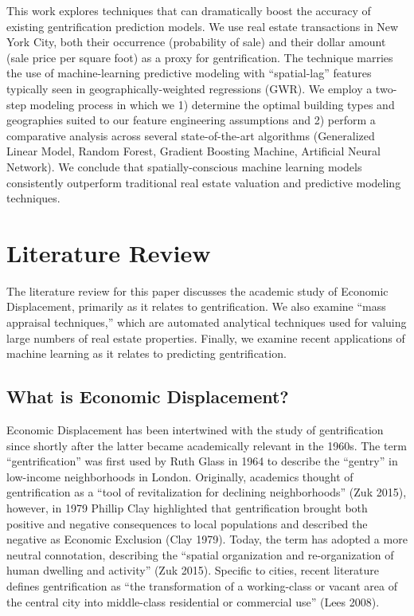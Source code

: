 \documentclass[12pt,]{article}
\begin{document}
This work explores techniques that can dramatically boost the accuracy
of existing gentrification prediction models. We use real estate
transactions in New York City, both their occurrence (probability of
sale) and their dollar amount (sale price per square foot) as a proxy
for gentrification. The technique marries the use of machine-learning
predictive modeling with ``spatial-lag'' features typically seen in
geographically-weighted regressions (GWR). We employ a two-step modeling
process in which we 1) determine the optimal building types and
geographies suited to our feature engineering assumptions and 2) perform
a comparative analysis across several state-of-the-art algorithms
(Generalized Linear Model, Random Forest, Gradient Boosting Machine,
Artificial Neural Network). We conclude that spatially-conscious machine
learning models consistently outperform traditional real estate
valuation and predictive modeling techniques.

\hypertarget{literature-review}{%
\section{Literature Review}\label{literature-review}}

The literature review for this paper discusses the academic study of
Economic Displacement, primarily as it relates to gentrification. We
also examine ``mass appraisal techniques,'' which are automated
analytical techniques used for valuing large numbers of real estate
properties. Finally, we examine recent applications of machine learning
as it relates to predicting gentrification.

\hypertarget{what-is-economic-displacement}{%
\subsection{What is Economic
Displacement?}\label{what-is-economic-displacement}}

Economic Displacement has been intertwined with the study of
gentrification since shortly after the latter became academically
relevant in the 1960s. The term ``gentrification'' was first used by
Ruth Glass in 1964 to describe the ``gentry'' in low-income
neighborhoods in London. Originally, academics thought of gentrification
as a ``tool of revitalization for declining neighborhoods'' (Zuk 2015),
however, in 1979 Phillip Clay highlighted that gentrification brought
both positive and negative consequences to local populations and
described the negative as Economic Exclusion (Clay 1979). Today, the
term has adopted a more neutral connotation, describing the ``spatial
organization and re-organization of human dwelling and activity'' (Zuk
2015). Specific to cities, recent literature defines gentrification as
``the transformation of a working-class or vacant area of the central
city into middle-class residential or commercial use'' (Lees 2008).
\end{document}
